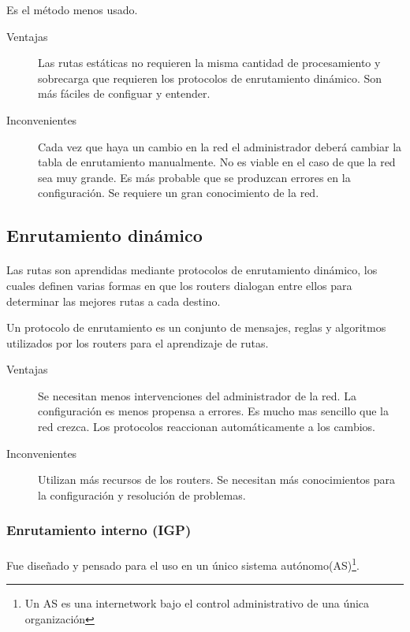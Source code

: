 \documentclass[a4paper,11pt]{article}
\begin{document}
Es el método menos usado.

\begin{description}
  \item[Ventajas]
  Las rutas estáticas no requieren la misma cantidad de procesamiento y sobrecarga que requieren los protocolos de enrutamiento dinámico.
  Son más fáciles de configuar y entender.
  \item[Inconvenientes]
  Cada vez que haya un cambio en la red el administrador deberá cambiar la tabla de enrutamiento manualmente.
  No es viable en el caso de que la red sea muy grande.
  Es más probable que se produzcan errores en la configuración.
  Se requiere un gran conocimiento de la red. 
\end{description}

\subsection{Enrutamiento dinámico}\label{subsec:endinamico}
\paragraph{  }
  Las rutas son aprendidas mediante protocolos de enrutamiento dinámico, los cuales definen varias formas en que los routers dialogan entre ellos para determinar las mejores rutas a cada destino.
  
  Un protocolo de enrutamiento es un conjunto de mensajes, reglas y algoritmos utilizados por los routers para el aprendizaje de rutas.  
  
  \begin{description}
  \item[Ventajas]
  Se necesitan menos intervenciones del administrador de la red.
  La configuración es menos propensa a errores.
  Es mucho mas sencillo que la red crezca.
  Los protocolos reaccionan automáticamente a los cambios.
  \item[Inconvenientes]
  Utilizan más recursos de los routers.
  Se necesitan más conocimientos para la configuración y resolución de problemas.
\end{description}

\subsubsection{Enrutamiento interno (IGP)}
\paragraph{  }
  Fue diseñado y pensado para el uso en un único sistema autónomo(AS)\footnote{Un AS es una internetwork bajo el control administrativo de una única organización}.
  
\end{document}
